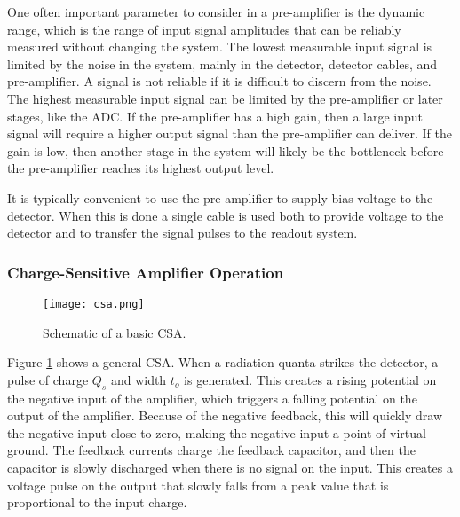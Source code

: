 \documentclass[../main/thesis.tex]{subfiles}
\begin{document}
One often important parameter to consider in a pre-amplifier is the dynamic range, which is the range of input signal amplitudes that can be reliably measured without changing the system. The lowest measurable input signal is limited by the noise in the system, mainly in the detector, detector cables, and pre-amplifier. A signal is not reliable if it is difficult to discern from the noise. The highest measurable input signal can be limited by the pre-amplifier or later stages, like the \gls{ADC}. If the pre-amplifier has a high gain, then a large input signal will require a higher output signal than the pre-amplifier can deliver. If the gain is low, then another stage in the system will likely be the bottleneck before the pre-amplifier reaches its highest output level. \citep{dynamic-range}

It is typically convenient to use the pre-amplifier to supply bias voltage to the detector. When this is done a single cable is used both to provide voltage to the detector and to transfer the signal pulses to the readout system. \citep[chap. 16]{Knoll}

\subsubsection{Charge-Sensitive Amplifier Operation}
\label{t-csa}
\begin{figure}%
	\centering
	\texttt{[image: csa.png]}
	\caption{Schematic of a basic \gls{CSA}. \citep{Hamamatsu}}
	\label{fig-csa}
\end{figure}

Figure \ref{fig-csa} shows a general \gls{CSA}. When a radiation quanta strikes the detector, a pulse of charge $Q_s$ and width $t_o$ is generated. This creates a rising potential on the negative input of the amplifier, which triggers a falling potential on the output of the amplifier. Because of the negative feedback, this will quickly draw the negative input close to zero, making the negative input a point of virtual ground. The feedback currents charge the feedback capacitor, and then the capacitor is slowly discharged when there is no signal on the input. This creates a voltage pulse on the output that slowly falls from a peak value that is proportional to the input charge. \citep{Hamamatsu}
\end{document}
